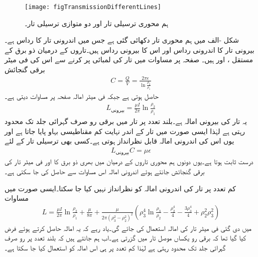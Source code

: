 \begin{figure}
\centering
\texttt{[image: figTransmissionDifferentLines]}
\caption{ہم محوری ترسیلی تار اور دو متوازی ترسیلی تار۔}
\label{شکل_ترسیل_مختلف_ترسیلی_تار}
\end{figure}
شکل -الف میں ہم محوری تار دکھائی گئی ہے جس میں اندرونی تار کا رداس  ہے۔بیرونی تار کا اندرونی رداس  اور اس کا بیرونی رداس  ہیں۔تاروں کے درمیان ذو برق کے مستقل ،   اور  ہیں۔ صفحہ  پر مساوات میں تار کی لمبائی  پر کرنے سے اس کی فی میٹر برقی گنجائش
 \begin{align}
C=\frac{Q}{V}=\frac{2\pi\epsilon }{\ln \frac{\rho_2}{\rho_1}}
\end{align}
حاصل ہوتی ہے جبکہ فی میٹر امالہ صفحہ  پر مساوات  دیتی ہے۔
\begin{align}
L_{\text{بیرونی}}=\frac{\mu  I }{2\pi} \ln \frac{\rho_2}{\rho_1}
\end{align}
یہ تار کی بیرونی امالہ ہے۔بلند تعدد پر تار میں برقی رو صرف گہرائی جلد تک محدود رہتی ہے لہٰذا ایسی صورت میں تار کے اندر نہایت کم مقناطیسی بہاو پایا جاتا ہے اور یوں اس کی  اندرونی امالہ قابل نظرانداز ہوتی ہے۔کسی بھی ترسیلی تار کے لئے
\begin{align}\label{مساوات_ترسیلی_امالہ_کپیسٹنس_عمومی_تعلق}
L_{\text{بیرونی}} C=\mu \epsilon
\end{align}
درست ثابت ہوتا ہے۔یوں دونوں ہم محوری تاروں کے درمیان  میں بھری ذو برق کا  اور فی میٹر تار کی برقی گنجائش جانتے ہوئے اندرونی امالہ اس مساوات سے حاصل کی جا سکتی ہے۔

کم تعدد پر تار کی اندرونی امالہ کو نظرانداز نہیں کیا جا سکتا۔ایسی صورت میں مساوات 
\begin{align}\label{مساوات_ترسیلی_کم_تعددی_امالہ}
L=\frac{\mu  I }{2\pi} \ln \frac{\rho_2}{\rho_1}+\frac{\mu }{8\pi}+\frac{\mu}{2\pi \left(\rho_3^2-\rho_2^2\right)^2}\left(\rho_3^4 \ln \frac{\rho_3}{\rho_2}-\frac{\rho_2^4}{4}-\frac{3\rho_3^4}{4}+\rho_2^2 \rho_3^2\right)
\end{align}
میں دی گئی فی میٹر تار کی امالہ استعمال کی جائے گی۔یاد رہے کہ یہ امالہ حاصل کرتے ہوئے فرض کیا گیا تھا کہ برقی رو یکساں موصل تار میں گزرتی ہے۔اب ہم جانتے ہیں کہ بلند تعدد پر رو صرف گہرائی جلد تک محدود رہتی ہے لہٰذا کم تعدد پر ہی اس امالہ کو استعمال کیا جا سکتا ہے۔

